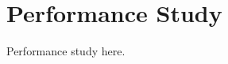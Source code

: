 \documentclass[../main/thesis.tex]{subfiles}
\begin{document}
\chapter{Performance Study}
\label{ch:5}
Performance study here.

\bib
\end{document}

